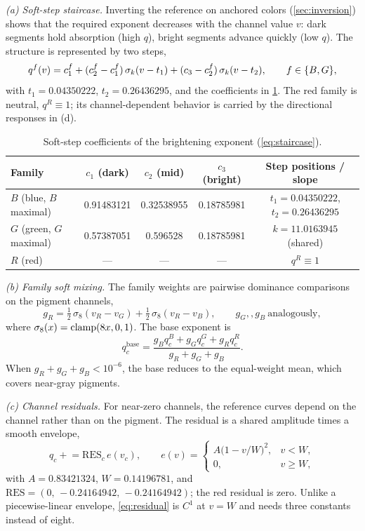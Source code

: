 \emph{(a) Soft-step staircase.} Inverting the reference on anchored colors (\cref{sec:inversion}) shows that the required exponent decreases with the channel value $v$: dark segments hold absorption (high $q$), bright segments advance quickly (low $q$). The structure is represented by two steps,
\begin{equation}
q^{f}(v)=c_{1}^{f}+(c_{2}^{f}-c_{1}^{f})\,\sigma_{k}(v-t_{1})+(c_{3}-c_{2}^{f})\,\sigma_{k}(v-t_{2}),
\qquad f\in\{B,G\},
\label{eq:staircase}
\end{equation}
with $t_{1}=0.04350222$, $t_{2}=0.26436295$, and the coefficients in \cref{tab:softstep}. The red family is neutral, $q^{R}\equiv1$; its channel-dependent behavior is carried by the directional responses in (d).

\begin{table}[t]
\centering
\small
\caption{Soft-step coefficients of the brightening exponent (\cref{eq:staircase}).}
\label{tab:softstep}
\begin{tabular}{lcccc}
\toprule
Family & $c_{1}$ (dark) & $c_{2}$ (mid) & $c_{3}$ (bright) & Step positions / slope \\
\midrule
$B$ (blue, $B$ maximal) & 0.91483121 & 0.32538955 & 0.18785981 & $t_{1}=0.04350222$, $t_{2}=0.26436295$ \\
$G$ (green, $G$ maximal) & 0.57387051 & 0.596528 & 0.18785981 & $k=11.0163945$ (shared) \\
$R$ (red) & --- & --- & --- & $q^{R}\equiv1$ \\
\bottomrule
\end{tabular}
\end{table}

\emph{(b) Family soft mixing.} The family weights are pairwise dominance comparisons on the pigment channels,
\begin{equation}
g_{R}=\tfrac12\,\sigma_{8}(v_{R}-v_{G})+\tfrac12\,\sigma_{8}(v_{R}-v_{B}),
\qquad g_{G},,g_{B}\ \text{analogously},
\label{eq:family-weights}
\end{equation}
where $\sigma_{8}(x)=\operatorname{clamp}(8x,0,1)$. The base exponent is
\begin{equation}
q_{c}^{\mathrm{base}}=\frac{g_{B}q_{c}^{B}+g_{G}q_{c}^{G}+g_{R}q_{c}^{R}}{g_{R}+g_{G}+g_{B}}.
\label{eq:qbase}
\end{equation}
When $g_{R}+g_{G}+g_{B}<10^{-6}$, the base reduces to the equal-weight mean, which covers near-gray pigments.

\emph{(c) Channel residuals.} For near-zero channels, the reference curves depend on the channel rather than on the pigment. The residual is a shared amplitude times a smooth envelope,
\begin{equation}
q_{c}\mathrel{+}=\mathrm{RES}_{c}\,e(v_{c}),\qquad
e(v)=
\begin{cases}
A\bigl(1-v/W\bigr)^{2}, & v<W,\\
0, & v\ge W,
\end{cases}
\label{eq:residual}
\end{equation}
with $A=0.83421324$, $W=0.14196781$, and $\mathrm{RES}=(0,\,-0.24164942,\,-0.24164942)$; the red residual is zero. Unlike a piecewise-linear envelope, \cref{eq:residual} is $C^{1}$ at $v=W$ and needs three constants instead of eight.

